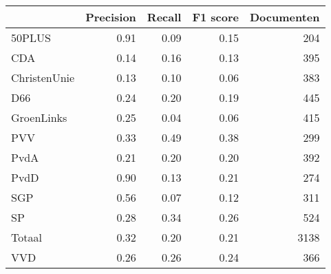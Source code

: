 \begin{tabular}{lrrrr}
\toprule
{} &  Precision &  Recall &  F1 score &  Documenten \\
\midrule
50PLUS       &       0.91 &    0.09 &      0.15 &         204 \\
CDA          &       0.14 &    0.16 &      0.13 &         395 \\
ChristenUnie &       0.13 &    0.10 &      0.06 &         383 \\
D66          &       0.24 &    0.20 &      0.19 &         445 \\
GroenLinks   &       0.25 &    0.04 &      0.06 &         415 \\
PVV          &       0.33 &    0.49 &      0.38 &         299 \\
PvdA         &       0.21 &    0.20 &      0.20 &         392 \\
PvdD         &       0.90 &    0.13 &      0.21 &         274 \\
SGP          &       0.56 &    0.07 &      0.12 &         311 \\
SP           &       0.28 &    0.34 &      0.26 &         524 \\
Totaal       &       0.32 &    0.20 &      0.21 &        3138 \\
VVD          &       0.26 &    0.26 &      0.24 &         366 \\
\bottomrule
\end{tabular}
